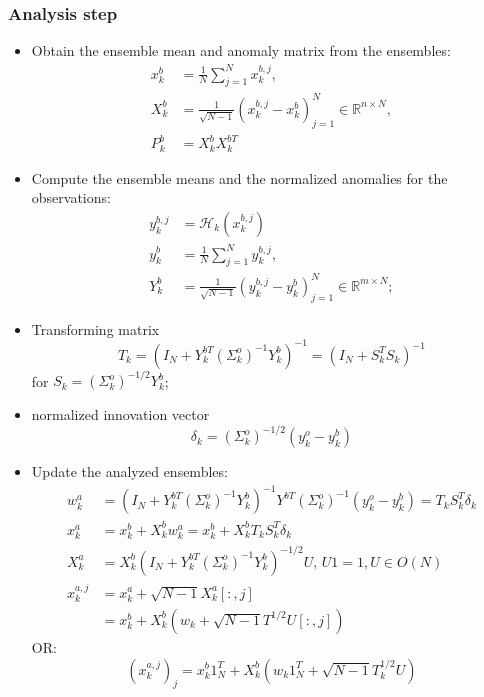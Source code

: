 \documentclass{article}
\begin{document}
\subsubsection{Analysis step}
\begin{itemize}
	\item Obtain the ensemble mean and anomaly matrix from the ensembles:
	      \begin{align*}
		      x_k^b & = \frac1N\sum_{j=1}^Nx_k^{b,j},                                           \\
		      X_k^b & = \frac1{\sqrt{N-1}}(x_k^{b,j} - x_k^b)_{j=1}^N\in\mathbb{R}^{n\times N}, \\
		      P_k^b & = X_k^bX_k^{bT}
	      \end{align*}
	\item Compute the ensemble means and the normalized anomalies for the observations:
	      \begin{align*}
		      y_k^{b,j} & = \mathcal{H}_k(x_k^{b,j})                                                \\
		      y_k^b     & = \frac1N\sum_{j=1}^Ny_k^{b,j},                                           \\
		      Y_k^b     & = \frac1{\sqrt{N-1}}(y_k^{b,j} - y_k^b)_{j=1}^N\in\mathbb{R}^{m\times N};
	      \end{align*}
	\item Transforming matrix
	      $$
		      T_k = (I_N+Y_k^{bT}(\Sigma_k^o)^{-1}Y_k^b)^{-1} = (I_N + S_k^TS_k)^{-1}
	      $$
	      for $S_k=(\Sigma_k^o)^{-1/2}Y_k^b$;

	\item normalized innovation vector
	      $$
		      \delta_k = (\Sigma_k^o)^{-1/2}(y_k^o-y_k^b)
	      $$
	\item Update the analyzed ensembles:
	      \begin{align*}
		      w_k^a     & = (I_N + Y_k^{bT}(\Sigma_k^o)^{-1} Y_k^b)^{-1}Y^{bT}(\Sigma_k^o)^{-1}(y_k^o-y_k^b)=T_kS_k^T\delta_k \\
		      x_k^a     & = x_k^b + X_k^bw_k^a = x_k^b + X_k^bT_kS_k^T\delta_k                                                \\
		      X_k^a     & = X_k^b(I_N+Y_k^{bT}(\Sigma_k^o)^{-1}Y_k^b)^{-1/2}U,\, U1=1, U\in O(N)                              \\
		      x_k^{a,j} & = x_k^a + \sqrt{N-1}X_k^a[:, j]                                                                     \\
		                & = x_k^b + X_k^b(w_k + \sqrt{N-1}T^{1/2}U[:, j])
	      \end{align*}
	      OR:
	      $$
		      (x_k^{a,j})_j = x_k^b1_N^T + X_k^b(w_k1_N^T+\sqrt{N-1}T_k^{1/2}U)
	      $$
\end{itemize}
\end{document}
